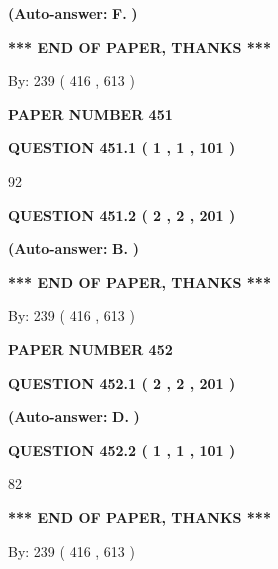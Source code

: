 \documentclass[12pt]{article}
\begin{document}
 
{\textbf{(Auto-answer:}}
{\textbf{\large{
F.}}}
{\textbf{)}}
 
 
   
   
   
   
\vspace{1.0in} 
{\textbf{\large{ *** END OF PAPER, THANKS *** }}} 
   
   
\hspace{1.0in} By: 
 239 ( 416 ,  613 )
   
   
   
   
\newpage 
\setcounter{page}{ 
   451001 } 
   
   
 {\textbf{ \Large{ PAPER NUMBER  451  }}}
   
   
   
   
  
  
{\textbf{\large{QUESTION
451.1 
 ( 1 , 1 , 101 )
}}}

92
  
  
{\textbf{\large{QUESTION
451.2 
 ( 2 , 2 , 201 )
}}}
 
 
{\textbf{(Auto-answer:}}
{\textbf{\large{
B.}}}
{\textbf{)}}
 
 
   
   
   
   
\vspace{1.0in} 
{\textbf{\large{ *** END OF PAPER, THANKS *** }}} 
   
   
\hspace{1.0in} By: 
 239 ( 416 ,  613 )
   
   
   
   
\newpage 
\setcounter{page}{ 
   452001 } 
   
   
 {\textbf{ \Large{ PAPER NUMBER  452  }}}
   
   
   
   
  
  
{\textbf{\large{QUESTION
452.1 
 ( 2 , 2 , 201 )
}}}
 
 
{\textbf{(Auto-answer:}}
{\textbf{\large{
D.}}}
{\textbf{)}}
 
 
  
  
{\textbf{\large{QUESTION
452.2 
 ( 1 , 1 , 101 )
}}}

82
   
   
   
   
\vspace{1.0in} 
{\textbf{\large{ *** END OF PAPER, THANKS *** }}} 
   
   
\hspace{1.0in} By: 
 239 ( 416 ,  613 )
   
   
   
\end{document}

